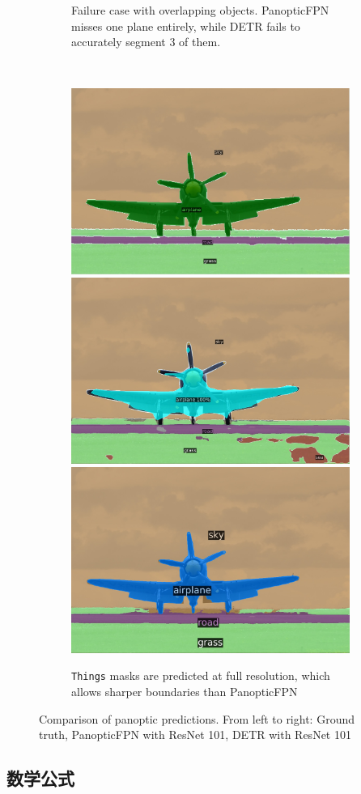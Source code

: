 \documentclass[11pt,a4paper,UTF8]{ctexart}
\begin{document}
\begin{figure}[htp]
\begin{subfigure}[t]{\textwidth}
       
       \caption{Failure case with overlapping objects. PanopticFPN misses one
         plane entirely, while DETR fails to accurately segment 3 of them.}
     \end{subfigure}
    \ \\
    \begin{subfigure}[t]{\textwidth}
        \centering
        \includegraphics[width=.32\textwidth]{img/Panoptic/3485_gt.jpg}
        \includegraphics[width=.32\textwidth]{img/Panoptic/3485_panopticfpn.jpg}
        \includegraphics[width=.32\textwidth]{img/Panoptic/3485_detr_R101.jpg}
        
        
        \caption{\texttt{Things} masks are predicted at full resolution, which allows sharper boundaries than PanopticFPN}
    \end{subfigure}%
\caption{Comparison of panoptic predictions. From left to right: Ground truth, PanopticFPN with ResNet 101, DETR with ResNet 101}
\label{fig:pano_quali_supl}
\end{figure}

\newpage
\subsection{数学公式}
\end{document}
